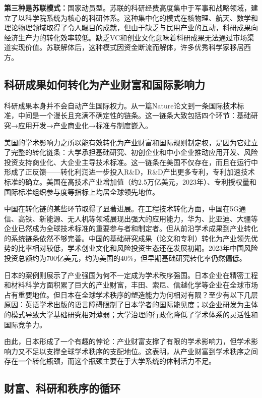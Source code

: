 \textbf{第三种是苏联模式：}国家动员型。苏联的科研经费高度集中于军事和战略领域，建立了以科学院系统为核心的科研体系。这种集中化的模式在核物理、航天、数学和理论物理领域取得了令人瞩目的成就，但由于缺乏与民用产业的互动，科研成果向经济生产力的转化效率较低。缺乏VC和创业文化意味着科研成果无法通过市场渠道实现价值。苏联解体后，这种模式因资金断流而解体，许多优秀科学家移居西方。

\subsection{科研成果如何转化为产业财富和国际影响力}

科研成果本身并不会自动产生国际权力。从一篇Nature论文到一条国际技术标准，中间是一个漫长且充满不确定性的链条。这一链条大致包括四个环节：基础研究→应用开发→产业商业化→标准与制度嵌入。

美国的学术影响力之所以能有效转化为产业财富和国际规则制定权，是因为它建立了完整的转化链条：大学承担基础研究、初创企业和中小企业推动应用开发、风险投资支持商业化、大企业主导技术标准。这一链条在美国不仅存在，而且在运行中形成了正反馈——转化利润进一步投入R\&D，R\&D产出更多专利，专利加速技术标准的确立。美国在高技术产业增加值（约2.5万亿美元，2023年）、专利授权量和国际标准组织参与度等指标上均居全球领先地位。

中国在转化链的某些环节取得了显著进展。在工程技术转化方面，中国在5G通信、高铁、新能源、无人机等领域展现出强大的应用能力，华为、比亚迪、大疆等企业已然成为全球技术标准的重要参与者和制定者。但从前沿学术成果到产业转化的系统链条依然不够完善。中国的基础研究成果（论文和专利）转化为产业领先优势的比率相对较低，学术创业文化和风险投资生态还在发展初期。2023年中国风险投资总额约为700亿美元，约为美国的40\%，但早期基础研究转化率仍然偏低。

日本的案例则展示了产业强国为何不一定成为学术秩序强国。日本企业在精密工程和材料科学方面积累了巨大的产业财富，丰田、索尼、信越化学等企业在全球市场占有重要地位。但日本在全球学术秩序的塑造能力为何相对有限？至少有以下几层原因：英语学术出版的语言障碍限制了日本学者的国际能见度；以企业研发为主体的模式导致大学基础研究相对薄弱；大学治理的行政化降低了学术体系的灵活性和国际竞争力。

由此，日本形成了一个有趣的悖论：产业财富支撑了有限的学术影响力，但学术影响力又不足以支撑全球学术秩序的支配地位。这表明，从产业财富到学术秩序之间存在一个转化瓶颈，而这个瓶颈主要在于大学系统的体制活力不足。

\subsection{财富、科研和秩序的循环}


